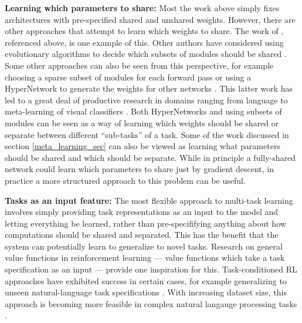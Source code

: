 \textbf{Learning which parameters to share:} Most the work above simply fixes architectures with pre-specified shared and unshared weights. However, there are other approaches that attempt to learn which weights to share. The work of \citet{Achille2018a}, referenced above, is one example of this.  Other authors have considered using evolutionary algorithms to decide which subsets of modules should be shared \citep{Fernando2017}. Some other approaches can also be seen from this perspective, for example choosing a sparse subset of modules for each forward pass \citep{Shazeer2017} or using a HyperNetwork to generate the weights for other networks \citep{Ha2016}. This latter work has led to a great deal of productive research in domains ranging from language \citep{Platanios2017} to meta-learning of visual classifiers \citep{Garnelo2018, Li2019a}. Both HyperNetworks and using subsets of modules can be seen as a way of learning which weights should be shared or separate between different ``sub-tasks'' of a task. Some of the work discussed in section \ref{meta_learning_sec} can also be viewed as learning what parameters should be shared and which should be separate. While in principle a fully-shared network could learn which parameters to share just by gradient descent, in practice a more structured approach to this problem can be useful. \par 

\textbf{Tasks as an input feature:} The most flexible approach to multi-task learning involves simply providing task representations as an input to the model and letting everything be learned, rather than pre-specififying anything about how computations should be shared and separated. This has the benefit that the system can potentially learn to generalize to novel tasks. Research on general value functions in reinforcement learning \citep{Sutton2011} --- value functions which take a task specification as an input --- provide one inspiration for this. Task-conditioned RL approaches have exhibited success in certain cases, for example generalizing to unseen natural-language task specifications \citep{Hermann2017}. With increasing dataset size, this approach is becoming more feasible in complex natural langauge processing tasks \citep{Raffel2019}. \par

